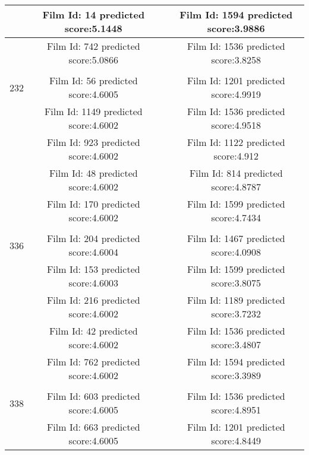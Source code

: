\begin{longtable}{|c|c|c|c|}
\hline
\multicolumn{ 1}{|c|}{} & Film Id: 14 predicted score:5.1448 &            & Film Id: 1594 predicted score:3.9886 \\
\hline
\multicolumn{ 1}{|c|}{} & Film Id: 742 predicted score:5.0866 &            & Film Id: 1536 predicted score:3.8258 \\
\hline
           &            &            &            \\
\hline
\multicolumn{ 1}{|c|}{232} & Film Id: 56 predicted score:4.6005 &            & Film Id: 1201 predicted score:4.9919 \\
\hline
\multicolumn{ 1}{|c|}{} & Film Id: 1149 predicted score:4.6002 &            & Film Id: 1536 predicted score:4.9518 \\
\hline
\multicolumn{ 1}{|c|}{} & Film Id: 923 predicted score:4.6002 &            & Film Id: 1122 predicted score:4.912 \\
\hline
\multicolumn{ 1}{|c|}{} & Film Id: 48 predicted score:4.6002 &            & Film Id: 814 predicted score:4.8787 \\
\hline
\multicolumn{ 1}{|c|}{} & Film Id: 170 predicted score:4.6002 &            & Film Id: 1599 predicted score:4.7434 \\
\hline
           &            &            &            \\
\hline
\multicolumn{ 1}{|c|}{336} & Film Id: 204 predicted score:4.6004 &            & Film Id: 1467 predicted score:4.0908 \\
\hline
\multicolumn{ 1}{|c|}{} & Film Id: 153 predicted score:4.6003 &            & Film Id: 1599 predicted score:3.8075 \\
\hline
\multicolumn{ 1}{|c|}{} & Film Id: 216 predicted score:4.6002 &            & Film Id: 1189 predicted score:3.7232 \\
\hline
\multicolumn{ 1}{|c|}{} & Film Id: 42 predicted score:4.6002 &            & Film Id: 1536 predicted score:3.4807 \\
\hline
\multicolumn{ 1}{|c|}{} & Film Id: 762 predicted score:4.6002 &            & Film Id: 1594 predicted score:3.3989 \\
\hline
           &            &            &            \\
\hline
\multicolumn{ 1}{|c|}{338} & Film Id: 603 predicted score:4.6005 &            & Film Id: 1536 predicted score:4.8951 \\
\hline
\multicolumn{ 1}{|c|}{} & Film Id: 663 predicted score:4.6005 &            & Film Id: 1201 predicted score:4.8449 \\

\end{longtable}
